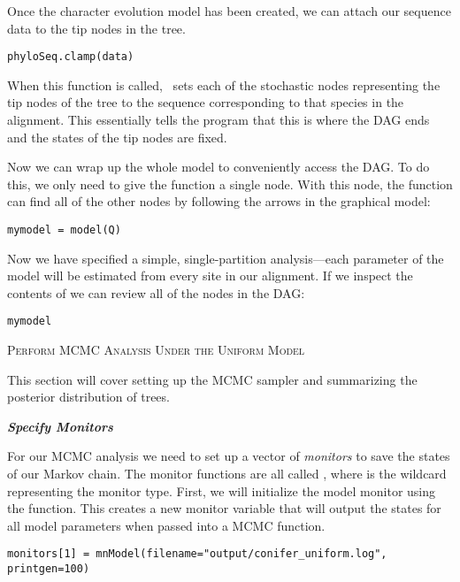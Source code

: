 Once the character evolution model has been created, we can attach our sequence data to the tip nodes in the tree.
{\tt \begin{snugshade*}
\begin{lstlisting}
phyloSeq.clamp(data)
\end{lstlisting}
\end{snugshade*}}
When this function is called, \RevBayes~sets each of the stochastic nodes representing the tip nodes of the tree to the sequence corresponding to that species in the alignment. 
This essentially tells the program that this is where the DAG ends and the states of the tip nodes are fixed. 

Now we can wrap up the whole model to conveniently access the DAG. To do this, we only need to give the  function a single node. With this node, the  function can find all of the other nodes by following the arrows in the graphical model:
{\tt \begin{snugshade*}
\begin{lstlisting}
mymodel = model(Q)
\end{lstlisting}
\end{snugshade*}}

Now we have specified a simple, single-partition analysis---each parameter of the model will be estimated from every site in our alignment.
If we inspect the contents of  we can review all of the nodes in the DAG:
{\tt \begin{snugshade*}
\begin{lstlisting}
mymodel
\end{lstlisting}
\end{snugshade*}}

\bigskip
{\large \textcolor{mycol}{\textsc{Perform MCMC Analysis Under the Uniform Model}}}

This section will cover setting up the MCMC sampler and summarizing the posterior distribution of trees. 

\textbf{\textit{Specify Monitors}}

For our MCMC analysis we need to set up a vector of \textit{monitors} to save the states of our Markov chain. 
The monitor functions are all called , where \cl{*} is the wildcard representing the monitor type.
First, we will initialize the model monitor using the  function. This creates a new monitor variable that will output the states for all model parameters when passed into a MCMC function. 
{\tt \begin{snugshade*}
\begin{lstlisting}
monitors[1] = mnModel(filename="output/conifer_uniform.log", printgen=100)
\end{lstlisting}
\end{snugshade*}}

